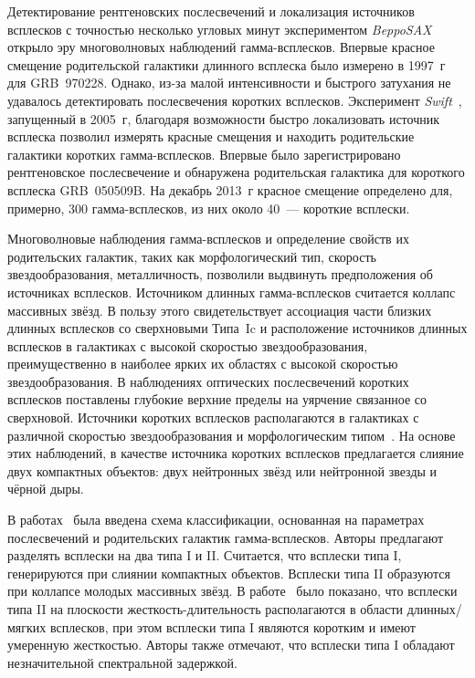 Детектирование рентгеновских послесвечений и локализация источников всплесков с 
точностью несколько угловых минут экспериментом \textit{BeppoSAX}~\citep{Boella1997} 
открыло эру многоволновых наблюдений гамма-всплесков. Впервые красное смещение 
родительской галактики длинного всплеска было измерено в 1997~г для GRB~970228. 
Однако, из-за малой интенсивности и быстрого затухания не удавалось детектировать 
послесвечения коротких всплесков. Эксперимент \textit{Swift}~\citep{Gehrels_2004}, 
запущенный в 2005~г, благодаря возможности быстро локализовать источник всплеска 
позволил измерять красные смещения и находить родительские галактики коротких 
гамма-всплесков. Впервые было зарегистрировано рентгеновское послесвечение и обнаружена 
родительская галактика для короткого всплеска GRB~050509B. На декабрь 2013~г красное 
смещение определено для, примерно, 300 гамма-всплесков, из них около 40~--- короткие всплески.

Многоволновые наблюдения гамма-всплесков и определение свойств их родительских галактик, 
таких как морфологический тип, скорость звездообразования, металличность, позволили 
выдвинуть предположения об источниках всплесков. Источником длинных гамма-всплесков 
считается коллапс массивных звёзд. В пользу этого свидетельствует ассоциация части 
близких длинных всплесков со сверхновыми Типа~Ic и расположение источников длинных 
всплесков в галактиках с высокой скоростью звездообразования, преимущественно в 
наиболее ярких их областях с высокой скоростью звездообразования. В наблюдениях 
оптических послесвечений коротких всплесков поставлены глубокие верхние пределы 
на уярчение связанное со сверхновой. Источники коротких всплесков располагаются 
в галактиках с различной скоростью звездообразования и морфологическим 
типом~\citep[см. обзор][]{Berger_2014}. На основе этих наблюдений, в качестве 
источника коротких всплесков предлагается слияние двух компактных объектов: 
двух нейтронных звёзд или нейтронной звезды и чёрной дыры.

В работах~\citep{Zhang_2006, Zhang_2007, Zhang_2009} была введена схема классификации, 
основанная на параметрах послесвечений и родительских галактик гамма-всплесков. 
Авторы предлагают разделять всплески на два типа I и II. Считается, что всплески 
типа I, генерируются при слиянии компактных объектов. Всплески типа II образуются 
при коллапсе молодых массивных звёзд. В работе~\citep{Zhang_2009} было показано, 
что всплески типа II на плоскости жесткость-длительность располагаются в области 
длинных/мягких всплесков, при этом всплески типа I являются коротким и имеют 
умеренную жесткостью. Авторы также отмечают, что всплески типа I обладают 
незначительной спектральной задержкой.

